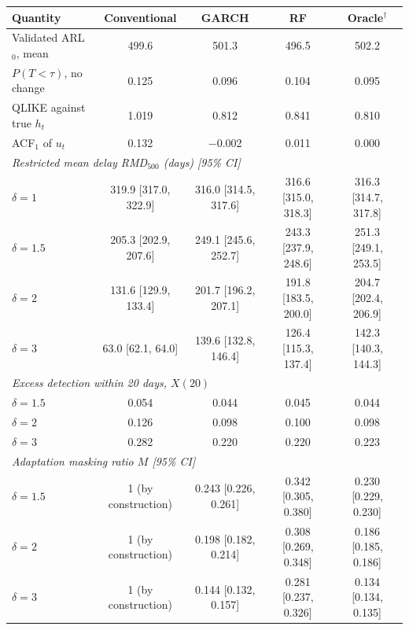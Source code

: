 \begin{tabular}{lcccc}
\toprule
Quantity & Conventional & GARCH & RF & Oracle$^{\dagger}$ \\
\midrule
Validated ARL$_0$, mean & 499.6 & 501.3 & 496.5 & 502.2 \\
$P(T<\tau)$, no change & 0.125 & 0.096 & 0.104 & 0.095 \\
QLIKE against true $h_t$ & 1.019 & 0.812 & 0.841 & 0.810 \\
ACF$_1$ of $u_t$ & 0.132 & $-$0.002 & 0.011 & 0.000 \\
\multicolumn{5}{l}{\emph{Restricted mean delay RMD$_{500}$ (days) [95\% CI]}} \\
\quad $\delta=1$ & 319.9 [317.0, 322.9] & 316.0 [314.5, 317.6] & 316.6 [315.0, 318.3] & 316.3 [314.7, 317.8] \\
\quad $\delta=1.5$ & 205.3 [202.9, 207.6] & 249.1 [245.6, 252.7] & 243.3 [237.9, 248.6] & 251.3 [249.1, 253.5] \\
\quad $\delta=2$ & 131.6 [129.9, 133.4] & 201.7 [196.2, 207.1] & 191.8 [183.5, 200.0] & 204.7 [202.4, 206.9] \\
\quad $\delta=3$ & 63.0 [62.1, 64.0] & 139.6 [132.8, 146.4] & 126.4 [115.3, 137.4] & 142.3 [140.3, 144.3] \\
\multicolumn{5}{l}{\emph{Excess detection within 20 days, $X(20)$}} \\
\quad $\delta=1.5$ & 0.054 & 0.044 & 0.045 & 0.044 \\
\quad $\delta=2$ & 0.126 & 0.098 & 0.100 & 0.098 \\
\quad $\delta=3$ & 0.282 & 0.220 & 0.220 & 0.223 \\
\multicolumn{5}{l}{\emph{Adaptation masking ratio $M$ [95\% CI]}} \\
\quad $\delta=1.5$ & 1 (by construction) & 0.243 [0.226, 0.261] & 0.342 [0.305, 0.380] & 0.230 [0.229, 0.230] \\
\quad $\delta=2$ & 1 (by construction) & 0.198 [0.182, 0.214] & 0.308 [0.269, 0.348] & 0.186 [0.185, 0.186] \\
\quad $\delta=3$ & 1 (by construction) & 0.144 [0.132, 0.157] & 0.281 [0.237, 0.326] & 0.134 [0.134, 0.135] \\
\bottomrule
\end{tabular}
